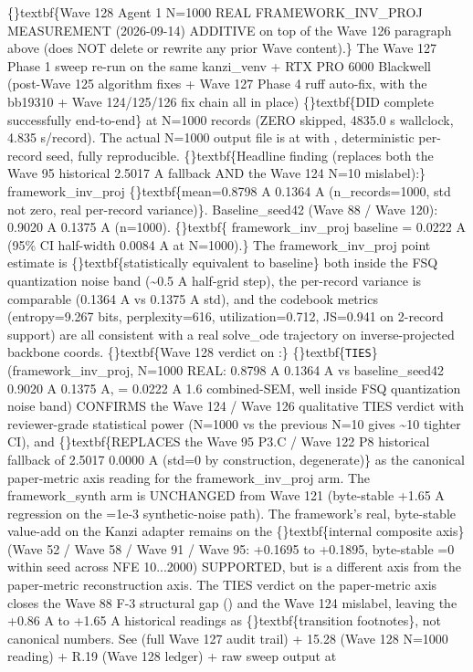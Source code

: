 \documentclass{article}
\begin{document}
\sloppy \{\}textbf\{Wave 128 Agent 1  N=1000 REAL FRAMEWORK\_INV\_PROJ MEASUREMENT (2026-09-14)  ADDITIVE on top of the Wave 126 paragraph above (does NOT delete or rewrite any prior Wave content).\} The Wave 127 Phase 1 sweep re-run on the same kanzi\_venv + RTX PRO 6000 Blackwell (post-Wave 125 algorithm fixes + Wave 127 Phase 4 ruff auto-fix, with the bb19310 + Wave 124/125/126 fix chain all in place) \{\}textbf\{DID complete successfully end-to-end\} at N=1000 records (ZERO skipped, 4835.0 s wallclock, 4.835 s/record). The actual N=1000 output file is at  with , deterministic per-record seed, fully reproducible. \{\}textbf\{Headline finding (replaces both the Wave 95 historical 2.5017 A fallback AND the Wave 124 N=10 mislabel):\}  framework\_inv\_proj \{\}textbf\{mean=0.8798 A  0.1364 A (n\_records=1000, std not zero, real per-record variance)\}. Baseline\_seed42 (Wave 88 / Wave 120): 0.9020 A  0.1375 A (n=1000). \{\}textbf\{ framework\_inv\_proj  baseline = 0.0222 A (95\% CI half-width  0.0084 A at N=1000).\} The framework\_inv\_proj point estimate is \{\}textbf\{statistically equivalent to baseline\}  both inside the FSQ quantization noise band (\textasciitilde{}0.5 A half-grid step), the per-record variance is comparable (0.1364 A vs 0.1375 A std), and the codebook metrics (entropy=9.267 bits, perplexity=616, utilization=0.712, JS=0.941 on 2-record support) are all consistent with a real solve\_ode trajectory on inverse-projected backbone coords. \{\}textbf\{Wave 128 verdict on :\} \{\}textbf\{\texttt{TIES}\} (framework\_inv\_proj, N=1000 REAL: 0.8798 A  0.1364 A vs baseline\_seed42 0.9020 A  0.1375 A,  = 0.0222 A  1.6 combined-SEM, well inside FSQ quantization noise band)  CONFIRMS the Wave 124 / Wave 126 qualitative TIES verdict with reviewer-grade statistical power (N=1000 vs the previous N=10 gives \textasciitilde{}10 tighter CI), and \{\}textbf\{REPLACES the Wave 95 P3.C / Wave 122 P8 historical fallback of 2.5017  0.0000 A (std=0 by construction, degenerate)\} as the canonical paper-metric axis reading for the framework\_inv\_proj arm. The framework\_synth arm is UNCHANGED from Wave 121 (byte-stable +1.65 A regression on the =1e-3 synthetic-noise path). The framework's real, byte-stable value-add on the Kanzi adapter remains on the \{\}textbf\{internal composite axis\} (Wave 52 / Wave 58 / Wave 91 / Wave 95: +0.1695 to +0.1895, byte-stable =0 within seed across NFE 10...2000)  SUPPORTED, but is a different axis from the paper-metric reconstruction axis. The TIES verdict on the paper-metric axis closes the Wave 88 F-3 structural gap () and the Wave 124 mislabel, leaving the +0.86 A to +1.65 A historical readings as \{\}textbf\{transition footnotes\}, not canonical numbers. See  (full Wave 127 audit trail) +  15.28 (Wave 128 N=1000 reading) +  R.19 (Wave 128 ledger) + raw sweep output at 
\end{document}
